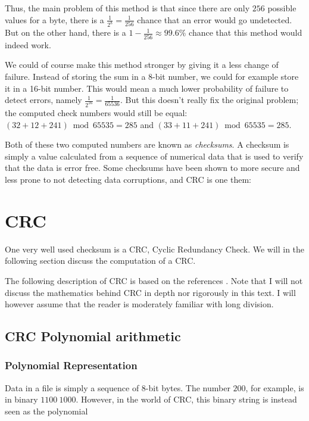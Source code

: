 Thus, the main problem of this method is that since there are only
$256$ possible values for a byte, there is a $\frac{1}{2^8} =
\frac{1}{256}$ chance that an error would go undetected. But on the
other hand, there is a $1 - \frac{1}{256} \approx 99.6\%$ chance that
this method would indeed work.

We could of course make this method stronger by giving it a less
change of failure. Instead of storing the sum in a 8-bit number, we
could for example store it in a 16-bit number. This would mean a much
lower probability of failure to detect errors, namely
$\frac{1}{2^{16}} = \frac{1}{65536}$. But this doesn't really fix the
original problem; the computed check numbers would still be equal:
$(32 + 12 + 241) \bmod 65535 = 285$ and $(33 + 11 + 241) \bmod 65535 =
285$.

Both of these two computed numbers are known as \textit{checksums}. A
checksum is simply a value calculated from a sequence of numerical
data that is used to verify that the data is error free. Some
checksums have been shown to more secure and less prone to not
detecting data corruptions, and CRC is one them:

\section{CRC}

One very well used checksum is a CRC, Cyclic Redundancy Check. We will
in the following section discuss the computation of a CRC.

The following description of CRC is based on the references
\cite{Ritter:1986:GCM:12647.12648,Williams_1993_crc_painless,tanenbaum2003computernetworks_crc,Nelson:1992:FVU:135011.135017_crc32,Stigge06reversingcrc,barr:_crc_implem_code_c,black:_fast_crc32_softw,geremia99:_cyclic}. Note
that I will not discuss the mathematics behind CRC in depth nor
rigorously in this text. I will however assume that the reader is
moderately familiar with long division.

\subsection{CRC Polynomial arithmetic}

\subsubsection{Polynomial Representation}

Data in a file is simply a sequence of 8-bit bytes. The number $200$,
for example, is in binary $1100\ 1000$. However, in the world of CRC,
this binary string is instead seen as the polynomial

